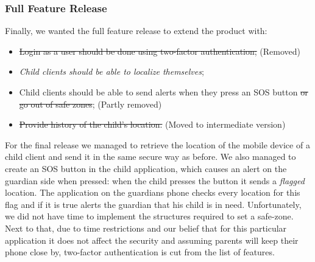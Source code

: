 \documentclass[a4paper]{article}
\begin{document}
\subsubsection{Full Feature Release}
Finally, we wanted the full feature release to extend the product with:
\begin{itemize}
    \item \sout{Login as a user should be done using two-factor authentication;} (Removed)
    \item \emph{Child clients should be able to localize themselves};
    \item Child clients should be able to send alerts when they press an SOS button \sout{or go out of safe zones}; (Partly removed)
    \item \sout{Provide history of the child's location.} (Moved to intermediate version)
\end{itemize}
For the final release we managed to retrieve the location of the mobile device of a child client and send it in the same secure way as before. We also managed to create an SOS button in the child application, which causes an alert on the guardian side when pressed: when the child presses the button it sends a \emph{flagged} location. The application on the guardians phone checks every location for this flag and if it is true alerts the guardian that his child is in need. Unfortunately, we did not have time to implement the structures required to set a safe-zone. Next to that, due to time restrictions and our belief that for this particular application it does not affect the security and assuming parents will keep their phone close by, two-factor authentication is cut from the list of features.

\end{document}
